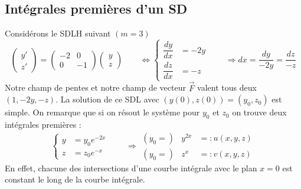 	\subsection{Intégrales premières d'un SD}
	Considérons le SDLH suivant $(m=3)$
	\begin{equation}
	\left(\begin{array}{c}
	y'\\
	z'
	\end{array}\right) = \left(\begin{array}{cc}
	-2 & 0\\
	0 & -1
	\end{array}\right)\left(\begin{array}{c}
	y\\
	z
	\end{array}\right)\qquad\Leftrightarrow\left\{\begin{array}{ll}
	\dfrac{dy}{dx} &= -2y\\
	\dfrac{dz}{dx} &= -z
	\end{array}\right.\qquad \Longrightarrow dx = \dfrac{dy}{-2y}=
	\dfrac{dz}{-z}
	\end{equation}
	Notre champ de pentes et notre champ de vecteur $\vec{F}$ valent 
	tous deux $(1,-2y,-z)$. La solution de ce SDL avec $(y(0),z(0)) =
	(y_0,z_0)$ est simple. On remarque que si on résout le système 
	pour $y_0$ et $z_0$ on trouve deux intégrales premières :
	\begin{equation}
	\left\{\begin{array}{ll}
	y &= y_0e^{-2x}\\
	z &= z_0e^{-x}
	\end{array}\right.\qquad \Rightarrow \begin{array}{lll}
	(y_0 =) & y^{2x} &=: u(x,y,z)\\
	(y_0 =) & z^{x} &=: v(x,y,z)	
	\end{array}
	\end{equation}
	En effet, chacune des intersections d'une courbe intégrale avec le 
	plan $x=0$ est constant le long de la courbe intégrale.
	
	\ \\
	
